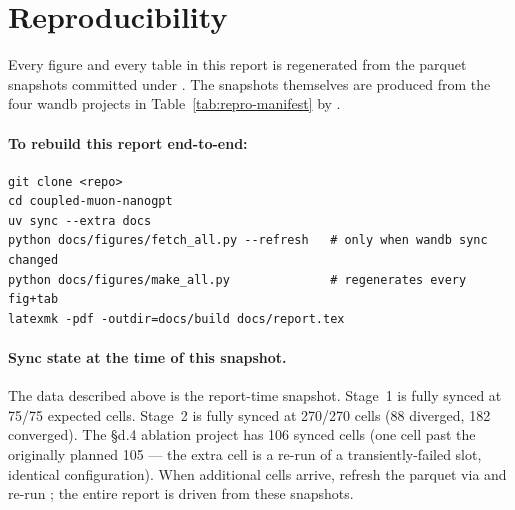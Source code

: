 \section{Reproducibility}\label{app:repro}

Every figure and every table in this report is regenerated from the parquet snapshots committed under . The snapshots themselves are produced from the four wandb projects in Table~\ref{tab:repro-manifest} by .

\begin{table}[h]
\centering
\caption{Reproducibility manifest. SHA is the first 12 hex chars of the SHA-256 of each parquet's bytes. The latest fetch timestamp is taken from .}\label{tab:repro-manifest}
\end{table}

\paragraph{To rebuild this report end-to-end:}

\begin{verbatim}
git clone <repo>
cd coupled-muon-nanogpt
uv sync --extra docs
python docs/figures/fetch_all.py --refresh   # only when wandb sync changed
python docs/figures/make_all.py              # regenerates every fig+tab
latexmk -pdf -outdir=docs/build docs/report.tex
\end{verbatim}

\paragraph{Sync state at the time of this snapshot.}
The data described above is the report-time snapshot. Stage~1 is fully synced at 75/75 expected cells. Stage~2 is fully synced at 270/270 cells (88 diverged, 182 converged). The \S d.4 ablation project has 106 synced cells (one cell past the originally planned 105 — the extra cell is a re-run of a transiently-failed slot, identical configuration). When additional cells arrive, refresh the parquet via  and re-run ; the entire report is driven from these snapshots.

